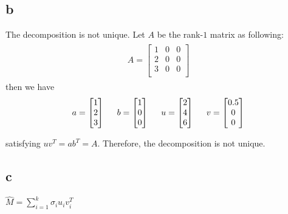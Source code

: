 \documentclass[a4paper,11pt]{article}
\theoremstyle{mytheor}
\begin{document}
\subsection*{b}
The decomposition is not unique.
Let $A$ be the rank-$1$ matrix as following:
\begin{align}
\begin{split}
A = \begin{bmatrix}
1  &0  &0 \\
2  &0  &0 \\
3  &0  &0 \\
\end{bmatrix}
\end{split}
\end{align}
then we have 
\begin{align}
\begin{split}
a = \begin{bmatrix}
1  \\
2  \\
3  \\
\end{bmatrix}
\hspace{0.5cm}
b = \begin{bmatrix}
1  \\
0  \\
0  \\
\end{bmatrix}
\hspace{0.5cm}
u = \begin{bmatrix}
2  \\
4  \\
6  \\
\end{bmatrix}
\hspace{0.5cm}
v = \begin{bmatrix}
0.5  \\
0  \\
0  \\
\end{bmatrix}
\end{split}
\end{align}

satisfying $uv^T = ab^T = A$. Therefore, the decomposition is not unique.

\subsection*{c}
$\widehat{M} = \sum\limits_{i=1}^{k}\sigma_i u_i v_i^T$
\end{document}
